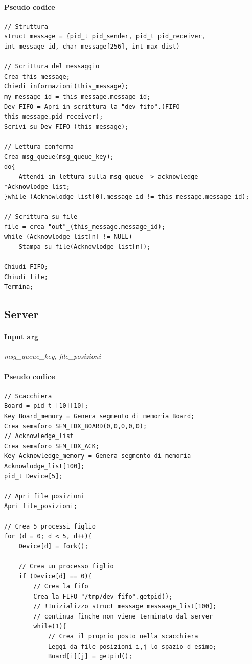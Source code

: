 \documentclass[10pt,a4paper]{article}
\begin{document}
{\paragraph{Pseudo codice}
\begin{Verbatim}
// Struttura
struct message = {pid_t pid_sender, pid_t pid_receiver, 
int message_id, char message[256], int max_dist) 

// Scrittura del messaggio
Crea this_message;
Chiedi informazioni(this_message);
my_message_id = this_message.message_id;
Dev_FIFO = Apri in scrittura la "dev_fifo".(FIFO this_message.pid_receiver);
Scrivi su Dev_FIFO (this_message);

// Lettura conferma
Crea msg_queue(msg_queue_key);
do{
	Attendi in lettura sulla msg_queue -> acknowledge *Acknowlodge_list;
}while (Acknowlodge_list[0].message_id != this_message.message_id);

// Scrittura su file
file = crea "out"_(this_message.message_id);
while (Acknowlodge_list[n] != NULL)
	Stampa su file(Acknowlodge_list[n]);

Chiudi FIFO;
Chiudi file;
Termina;
\end{Verbatim}

\subsection{Server}
\paragraph{Input arg}
\emph{msg\_queue\_key, file\_posizioni}
\paragraph{Pseudo codice}

\begin{Verbatim}[tabsize = 3]
// Scacchiera
Board = pid_t [10][10];
Key Board_memory = Genera segmento di memoria Board;
Crea semaforo SEM_IDX_BOARD(0,0,0,0,0);
// Acknowledge_list
Crea semaforo SEM_IDX_ACK;
Key Acknowledge_memory = Genera segmento di memoria Acknowlodge_list[100];
pid_t Device[5];

// Apri file posizioni
Apri file_posizioni;

// Crea 5 processi figlio
for (d = 0; d < 5, d++){
	Device[d] = fork();	
	
	// Crea un processo figlio
	if (Device[d] == 0){
		// Crea la fifo 
		Crea la FIFO "/tmp/dev_fifo".getpid();
		// !Inizializzo struct message messaage_list[100];
		// continua finche non viene terminato dal server
		while(1){
			// Crea il proprio posto nella scacchiera
			Leggi da file_posizioni i,j lo spazio d-esimo;			
			Board[i][j] = getpid();
			

\end{Verbatim}}
\end{document}
